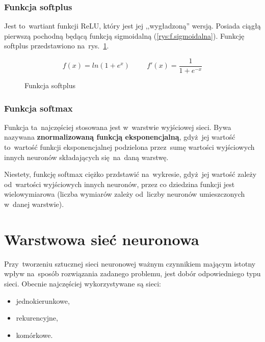 \subsubsection{Funkcja softplus}
Jest to~wartiant funkcji ReLU, który jest jej ,,wygładzoną'' wersją. Posiada ciągłą pierwszą pochodną będącą funkcją
sigmoidalną (\ref{rys:f.sigmoidalna}). Funkcję softplus przedstawiono na~rys.~\ref{rys:f.softplus}.

\begin{minipage}[t]{\textwidth}
\begin{equation}
	f(x) = ln(1 + e^x)  \hspace{1cm} f'(x) = \frac{1}{1 + e^{-x}}
\end{equation}
\begin{figure}[H]
    \centering
    \caption{Funkcja softplus}
    \label{rys:f.softplus}
\end{figure}
\end{minipage}

\subsubsection{Funkcja softmax}
Funkcja ta~najczęściej stosowana jest w~warstwie wyjściowej sieci. Bywa nazywana \textbf{znormalizowaną funkcją
eksponencjalną}, gdyż~jej wartość to~wartość funkcji eksponencjalnej podzielona przez~sumę wartości wyjściowych innych
neuronów składających się~na~daną warstwę.

Niestety, funkcję softmax ciężko przdstawić na~wykresie, gdyż~jej wartość zależy od~wartości wyjściowych
innych neuronów, przez co dziedzina funkcji jest wielowymiarowa (liczba wymiarów zależy od~liczby neuronów
umieszczonych w~danej warstwie).

\section{Warstwowa sieć neuronowa}
Przy~tworzeniu sztucznej sieci neuronowej ważnym czynnikiem mającym istotny wpływ na~sposób rozwiązania
zadanego problemu, jest dobór odpowiedniego typu sieci. Obecnie najczęściej wykorzystywane są sieci:
\begin{itemize}
  \item jednokierunkowe,
  \item rekurencyjne,
  \item komórkowe.
\end{itemize}

